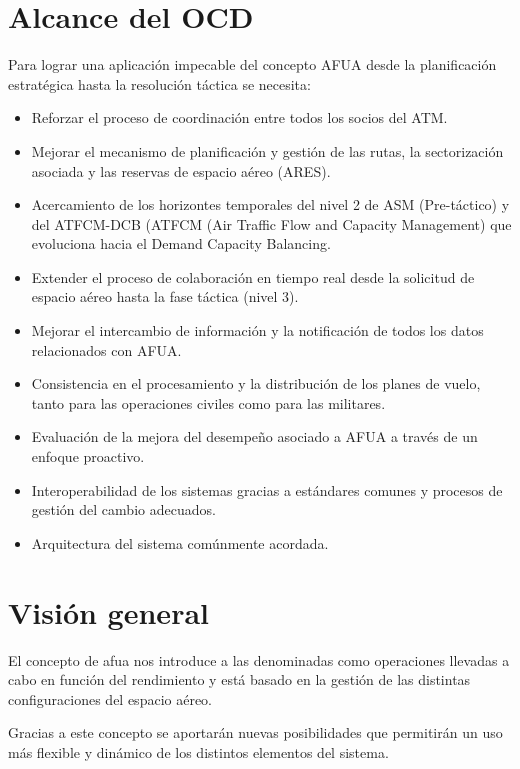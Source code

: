 \section{Alcance del OCD}

Para lograr una aplicación impecable del concepto AFUA desde la planificación estratégica hasta la resolución táctica se necesita:

\begin{itemize}
    \item Reforzar el proceso de coordinación entre todos los socios del ATM.
    \item Mejorar el mecanismo de planificación y gestión de las rutas, la sectorización asociada y las reservas de espacio aéreo (ARES).
    \item Acercamiento de los horizontes temporales del nivel 2 de ASM (Pre-táctico) y del ATFCM-DCB (ATFCM (Air Traffic Flow and Capacity Management) que evoluciona hacia el Demand Capacity Balancing.
    \item Extender el proceso de colaboración en tiempo real desde la solicitud de espacio aéreo hasta la fase táctica (nivel 3).
    \item Mejorar el intercambio de información y la notificación de todos los datos relacionados con AFUA.
    \item Consistencia en el procesamiento y la distribución de los planes de vuelo, tanto para las operaciones civiles como para las militares.
    \item Evaluación de la mejora del desempeño asociado a AFUA a través de un enfoque proactivo.
    \item Interoperabilidad de los sistemas gracias a estándares comunes y procesos de gestión del cambio adecuados.
    \item Arquitectura del sistema comúnmente acordada.
\end{itemize}

\section{Visión general}

El concepto de \acrfull{afua} nos introduce a las denominadas como operaciones llevadas a cabo en función del rendimiento y está basado en la gestión de las distintas configuraciones del espacio aéreo. 

Gracias a este concepto se aportarán nuevas posibilidades que permitirán un uso más flexible y dinámico de los distintos elementos del sistema. 

